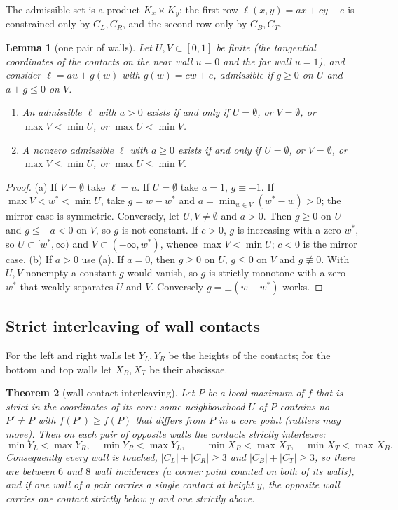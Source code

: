 \documentclass[11pt]{amsart}
\newtheorem{theorem}{Theorem}[section]
\newtheorem{lemma}[theorem]{Lemma}
\theoremstyle{definition}
\begin{document}
The admissible set is a product $K_x \times K_y$: the first row $\ell(x,y) = ax + cy + e$ is constrained only by $C_L, C_R$, and the second row only by $C_B, C_T$.

\begin{lemma}[one pair of walls]\label{lem:pair}
Let $U, V \subset [0,1]$ be finite (the tangential coordinates of the contacts on the near wall $u=0$ and the far wall $u=1$), and consider $\ell = a u + g(w)$ with $g(w) = cw + e$, admissible if $g \ge 0$ on $U$ and $a + g \le 0$ on $V$.
\begin{enumerate}[label=(\alph*)]
\item An admissible $\ell$ with $a > 0$ exists if and only if $U = \emptyset$, or $V = \emptyset$, or $\max V < \min U$, or $\max U < \min V$.
\item A nonzero admissible $\ell$ with $a \ge 0$ exists if and only if $U = \emptyset$, or $V = \emptyset$, or $\max V \le \min U$, or $\max U \le \min V$.
\end{enumerate}
\end{lemma}

\begin{proof}
(a) If $V = \emptyset$ take $\ell = u$. If $U = \emptyset$ take $a = 1$, $g \equiv -1$. If $\max V < w^* < \min U$, take $g = w - w^*$ and $a = \min_{w\in V}(w^*-w) > 0$; the mirror case is symmetric. Conversely, let $U, V \ne \emptyset$ and $a > 0$. Then $g \ge 0$ on $U$ and $g \le -a < 0$ on $V$, so $g$ is not constant. If $c > 0$, $g$ is increasing with a zero $w^*$, so $U \subset [w^*,\infty)$ and $V \subset (-\infty,w^*)$, whence $\max V < \min U$; $c < 0$ is the mirror case.
(b) If $a > 0$ use (a). If $a = 0$, then $g \ge 0$ on $U$, $g \le 0$ on $V$ and $g \not\equiv 0$. With $U, V$ nonempty a constant $g$ would vanish, so $g$ is strictly monotone with a zero $w^*$ that weakly separates $U$ and $V$. Conversely $g = \pm(w-w^*)$ works.
\end{proof}

\subsection{Strict interleaving of wall contacts}
For the left and right walls let $Y_L, Y_R$ be the heights of the contacts; for the bottom and top walls let $X_B, X_T$ be their abscissae.

\begin{theorem}[wall-contact interleaving]\label{thm:interleave}
Let $P$ be a local maximum of $f$ that is \emph{strict in the coordinates of its core}: some neighbourhood $U$ of $P$ contains no $P' \ne P$ with $f(P') \ge f(P)$ that differs from $P$ in a core point (rattlers may move). Then on each pair of opposite walls the contacts strictly interleave:
\[
  \min Y_L < \max Y_R,\quad \min Y_R < \max Y_L,\qquad \min X_B < \max X_T,\quad \min X_T < \max X_B .
\]
Consequently every wall is touched, $|C_L| + |C_R| \ge 3$ and $|C_B| + |C_T| \ge 3$, so there are between $6$ and $8$ wall incidences (a corner point counted on both of its walls), and if one wall of a pair carries a single contact at height $y$, the opposite wall carries one contact strictly below $y$ and one strictly above.
\end{theorem}
\end{document}
